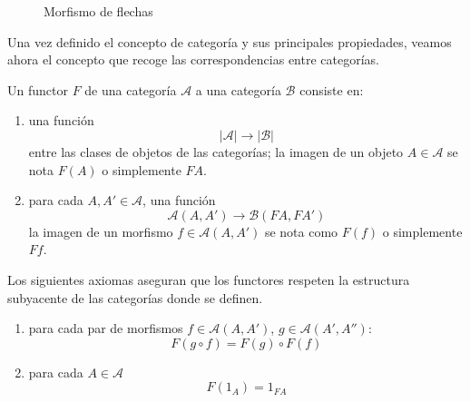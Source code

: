 \begin{figure}[htpb] %
    \centering
    \caption{Morfismo de flechas}
    \label{diag:diagrama-flechas}
\end{figure}

Una vez definido el concepto de categoría y sus principales propiedades, veamos ahora el concepto que recoge las correspondencias entre categorías.

\begin{definicion}
    Un functor $F$ de una categoría $\mathscr{A}$ a una categoría $\mathscr{B}$ consiste en:

    \begin{enumerate}
        \item una función \begin{equation}|\mathscr{A}| \longrightarrow |\mathscr{B}| \end{equation} entre las clases de objetos de las categorías; la imagen de un objeto $A \in \mathscr{A}$ se nota $F(A)$ o simplemente $FA$.

        \item para cada $A, A' \in \mathscr{A}$, una función \begin{equation}\mathscr{A}(A,A') \longrightarrow \mathscr{B}(FA,FA') \end{equation}
        la imagen de un morfismo $f \in \mathscr{A}(A,A')$ se nota como $F(f)$ o simplemente $Ff$.
    \end{enumerate}
    \label{functor}

 Los siguientes axiomas aseguran que los functores respeten la estructura subyacente de las categorías donde se definen.
  \begin{enumerate}
        \item para cada par de morfismos $f \in \mathscr{A}(A,A')$, $g \in          \mathscr{A}(A',A''): $ \begin{equation} F(g \circ f) = F(g) \circ F(f)   \end{equation}

        \item para cada $A \in \mathscr{A}$ \begin{equation}
            F(1_{A}) = 1_{FA}
        \end{equation}
    \end{enumerate} 

\end{definicion}

